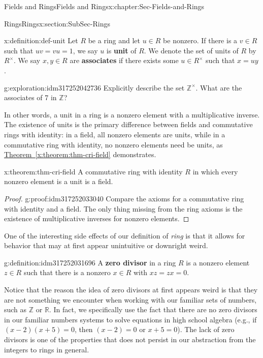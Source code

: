 \documentclass[oneside,10pt,]{book}
\newcommand{\xreffont}{\relax}
\newcommand{\terminology}[1]{\textbf{#1}}
\numberwithin{equation}{section}
\def\Z{{\mathbb Z}}
\def\R{{\mathbb R}}
\begin{document}
\begin{chapterptx}{Fields and Rings}{}{Fields and Rings}{}{}{x:chapter:Sec-Fields-and-Rings}
\begin{sectionptx}{Rings}{}{Rings}{}{}{x:section:SubSec-Rings}
\begin{definition}{}{x:definition:def-unit}%
%
%
Let \(R\) be a ring and let \(u\in R\) be nonzero. If there is a \(v\in R\) such that \(uv = vu = 1\), we say \(u\) is \terminology{unit} of \(R\). We denote the set of units of \(R\) by \(R^\times\). We say \(x,y\in R\) are \terminology{associates} if there exists some \(u\in R^\times\) such that \(x = uy\).%
\end{definition}
\begin{exploration}{}{g:exploration:idm317252042736}%
Explicitly describe the set \(\Z^\times\). What are the associates of 7 in \(\Z\)?%
\end{exploration}
In other words, a unit in a ring is a nonzero element with a multiplicative inverse. The existence of units is the primary difference between fields and commutative rings with identity: in a field, all nonzero elements are units, while in a commutative ring with identity, no nonzero elements need be units, as \hyperref[x:theorem:thm-cri-field]{Theorem~{\xreffont\ref{x:theorem:thm-cri-field}}} demonstrates.%
\begin{theorem}{}{}{x:theorem:thm-cri-field}%
A commutative ring with identity \(R\) in which every nonzero element is a unit is a field.%
\end{theorem}
\begin{proof}{}{g:proof:idm317252033040}
Compare the axioms for a commutative ring with identity and a field. The only thing missing from the ring axioms is the existence of multiplicative inverses for nonzero elements.%
\end{proof}
One of the interesting side effects of our definition of \emph{ring} is that it allows for behavior that may at first appear unintuitive or downright weird.%
\begin{definition}{}{g:definition:idm317252031696}%
%
A \terminology{zero divisor} in a ring \(R\) is a nonzero element \(z\in R\) such that there is a nonzero \(x\in R\) with \(xz = zx = 0\).%
\end{definition}
Notice that the reason the idea of zero divisors at first appears weird is that they are not something we encounter when working with our familiar sets of numbers, such as \(\Z\) or \(\R\). In fact, we specifically use the fact that there are no zero divisors in our familiar numbers systems to solve equations in high school algebra (e.g., if \((x-2)(x+5)=0\), then \((x-2)=0\) or \(x+5=0\)). The lack of zero divisors is one of the properties that does not persist in our abstraction from the integers to rings in general.%

\end{sectionptx}
\end{chapterptx}
\end{document}

